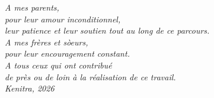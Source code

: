 \thispagestyle{empty}
\begin{center}
\vspace*{4cm}
\Large\itshape
A mes parents,\\[0.5cm]
pour leur amour inconditionnel,\\[0.3cm]
leur patience et leur soutien tout au long de ce parcours.\\[1.5cm]
A mes fr\`eres et s\`oeurs,\\[0.3cm]
pour leur encouragement constant.\\[1.5cm]
A tous ceux qui ont contribu\'e\\[0.3cm]
de pr\`es ou de loin \`a la r\'ealisation de ce travail.\\[3cm]
\normalsize\upshape
{\large Kenitra, 2026}
\end{center}
